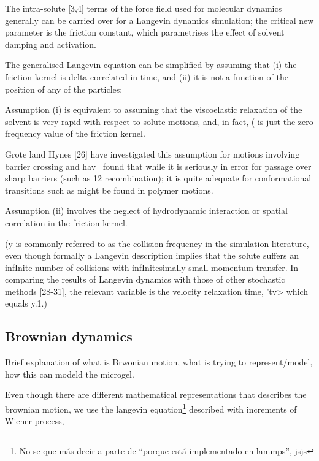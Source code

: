 \documentclass[../../main-notes.tex]{subfiles}
\begin{document}
{The intra-solute [3,4] terms of the force field used for molecular dynamics generally can be carried over for a Langevin dynamics simulation; the critical new parameter is the friction constant, which parametrises the effect of solvent damping and activation.

The generalised Langevin equation can be simplified by assuming that (i) the friction kernel is delta correlated in time, and (ii) it is not a function of the position of any of the particles:

Assumption (i) is equivalent to assuming that the viscoelastic relaxation of the solvent is very rapid with respect to solute motions, and, in fact, ( is just the zero frequency value of the friction kernel.

Grote land Hynes [26] have investigated this assumption for motions involving barrier crossing and hav~ found that while it is seriously in error for passage over sharp barriers (such as 12 recombination); it is quite adequate for conformational transitions such as might be found in polymer motions.

Assumption (ii) involves the neglect of hydrodynamic interaction or spatial correlation in the friction kernel.

(y is commonly referred to as the collision frequency in the simulation literature, even though formally a Langevin description implies that the solute suffers an infInite number of collisions with infInitesimally small momentum transfer. In comparing the results of Langevin dynamics with those of other stochastic methods [28-31], the relevant variable is the velocity relaxation time, 'tv> which equals y.1.)




\subsection{Brownian dynamics}

Brief explanation of what is Brwonian motion, what is trying to represent/model, how this can modeld the microgel.

Even though there are different mathematical representations that describes the brownian motion, we use the langevin equation\footnote{No se que más decir a parte de ``porque está implementado en lammps'', jsjs} described with increments of Wiener process,




}
\end{document}
